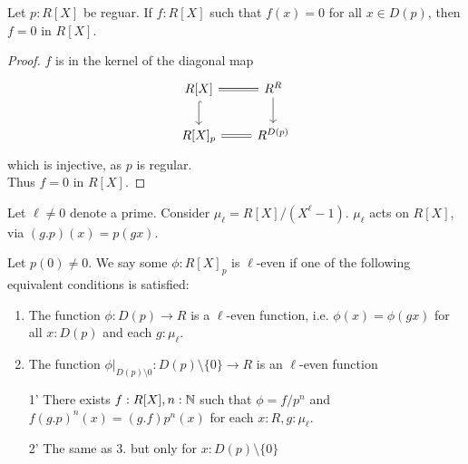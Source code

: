 \begin{lemma}{\label{lemma:AlmostEverywhere}}
	Let $p : R[X]$ be reguar. If $f : R[X]$ such that $f(x) = 0$ for all $x \in D(p)$, then $f = 0$ in $R[X]$.
\end{lemma}
\begin{proof}
	$f$ is in the kernel of the diagonal map
\[\begin{tikzcd}
	{R[X]} & {R^R} \\
	{R[X]_p} & {R^{D(p)}}
	\arrow[hook, from=1-1, to=2-1]
	\arrow[Rightarrow, no head, from=1-2, to=1-1]
	\arrow[from=1-2, to=2-2]
	\arrow[Rightarrow, no head, from=2-2, to=2-1]
\end{tikzcd}\]
	which is injective, as $p$ is regular. \\
	Thus $f = 0$ in $R[X]$.
\end{proof}
Let $\ell \neq 0$ denote a prime. Consider $\mu_\ell = R[X] / (X^\ell - 1)$.
 $\mu_\ell$ acts on $R[X]$, via $(g.p)(x) = p(g x)$. 
\begin{lemma}
	Let $p(0) \neq 0$. We say some $\phi: R[X]_p$ is $\ell$-even if one of the following equivalent conditions is satisfied:
	\begin{enumerate}

	\item The function $\phi : D(p) \to R$ is a $\ell$-even function, i.e. $\phi(x) = \phi(g x)$ for all $ x : D(p)$ and each $g : \mu_\ell$.
	\item The function $\phi|_{D(p) \setminus 0} : D(p) \setminus \{0\} \to R$ is an $\ell$-even function
	\item[1']  There exists $f : R[X], n : \mathbb{N}$ such that $\phi= f/ p^n$ and $f (g.p)^n (x) = (g.f) p^n (x)$ for each $x : R , g : \mu_\ell$.
	\item[2'] The same as 3. but only for $x : D(p) \setminus\{0\}$
\end{enumerate}
\end{lemma}
